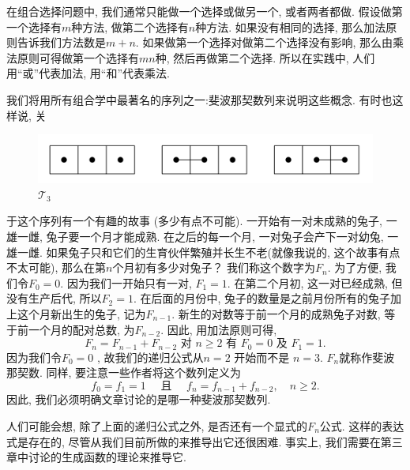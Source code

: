 \documentclass{ctexbook}
\begin{document}
在组合选择问题中, 我们通常只能做一个选择或做另一个, 或者两者都做. 假设做第一个选择有$m$种方法, 做第二个选择有$n$种方法.
如果没有相同的选择, 那么加法原则告诉我们方法数是$m+n$. 如果做第一个选择对做第二个选择没有影响,
那么由乘法原则可得做第一个选择有$mn$种, 然后再做第二个选择. 所以在实践中, 人们用“或”代表加法, 用“和”代表乘法.


我们将用所有组合学中最著名的序列之一:斐波那契数列来说明这些概念. 有时也这样说, 关


\begin{figure}
    \centering
    \includegraphics[scale=0.8]{./fig1/figure1.1.jpg}
    \caption{$\mathcal{T}_{3}$}\label{fig-1}
\end{figure}





\noindent
于这个序列有一个有趣的故事
(多少有点不可能). 一开始有一对未成熟的兔子, 一雄一雌, 兔子要一个月才能成熟. 在之后的每一个月, 一对兔子会产下一对幼兔,
一雄一雌. 如果兔子只和它们的生育伙伴繁殖并长生不老(就像我说的, 这个故事有点不太可能), 那么在第$n$个月初有多少对兔子？
我们称这个数字为$F_{n}$. 为了方便, 我们令$F_{0}=0 $. 因为我们一开始只有一对, $F_{1}=1$. 在第二个月初, 这一对已经成熟,
但没有生产后代, 所以$F_{2}=1$. 在后面的月份中, 兔子的数量是之前月份所有的兔子加上这个月新出生的兔子, 记为$F_{n-1}$.
新生的对数等于前一个月的成熟兔子对数, 等于前一个月的配对总数, 为$F_{n-2}$. 因此, 用加法原则可得,
\begin{equation}
F_{n}=F_{n-1}+F_{n-2} \text { 对 } n \geqslant 2 \text { 有 } F_{0}=0 \text { 及 } F_{1}=1.
\end{equation}
因为我们令$F_{0}=0 $ , 故我们的递归公式从$n=2$ 开始而不是 $n=3$. $F_{n}$就称作斐波那契数. 同样, 要注意一些作者将这个数列定义为
\begin{equation}
f_{0}=f_{1}=1 \quad \text { 且  } \quad  f_{n}=f_{n-1}+f_{n-2}, \quad  n \geqslant 2.
\end{equation}
因此, 我们必须明确文章讨论的是哪一种斐波那契数列.

人们可能会想, 除了上面的递归公式之外, 是否还有一个显式的$F_{n}$公式. 这样的表达式是存在的,
尽管从我们目前所做的来推导出它还很困难. 事实上, 我们需要在第三章中讨论的生成函数的理论来推导它.
\end{document}
